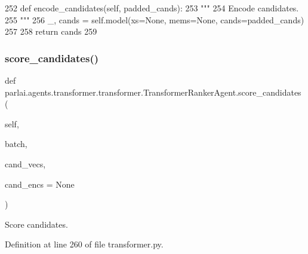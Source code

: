 \begin{DoxyCode}
252     \textcolor{keyword}{def }encode\_candidates(self, padded\_cands):
253         \textcolor{stringliteral}{"""}
254 \textcolor{stringliteral}{        Encode candidates.}
255 \textcolor{stringliteral}{        """}
256         \_, cands = self.model(xs=\textcolor{keywordtype}{None}, mems=\textcolor{keywordtype}{None}, cands=padded\_cands)
257 
258         \textcolor{keywordflow}{return} cands
259 
\end{DoxyCode}
\mbox{\label{classparlai_1_1agents_1_1transformer_1_1transformer_1_1TransformerRankerAgent_af1af764f534c04a7bc98f11b3fe8f6ca}} 
\subsubsection{\texorpdfstring{score\+\_\+candidates()}{score\_candidates()}}
{\footnotesize\ttfamily def parlai.\+agents.\+transformer.\+transformer.\+Transformer\+Ranker\+Agent.\+score\+\_\+candidates (\begin{DoxyParamCaption}\item[{}]{self,  }\item[{}]{batch,  }\item[{}]{cand\+\_\+vecs,  }\item[{}]{cand\+\_\+encs = {\ttfamily None} }\end{DoxyParamCaption})}

\begin{DoxyVerb}Score candidates.
\end{DoxyVerb}
 

Definition at line 260 of file transformer.\+py.


